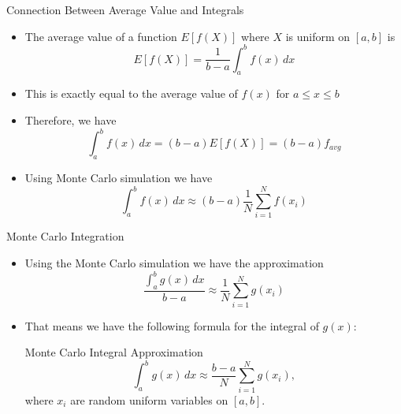 \documentclass[10pt]{beamer}
\begin{document}
\begin{frame}{Connection Between Average Value and Integrals}

\begin{itemize}
    \item The average value of a function $E[f(X)]$ where $X$ is uniform on $[a,b]$ is 
        $$ E[f(X)]= \frac{1}{b-a}\int_a^b f(x)\,dx$$
    \item This is exactly equal to the average value of $f(x)$ for $a \le x \le b$ 
    \item Therefore, we have 
        $$ \int_a^b f(x)\,dx = (b-a)E[f(X)] = (b-a) f_{avg}$$
    \item Using Monte Carlo simulation we have 
        $$\int_a^b f(x)\,dx \approx (b-a) \frac{1}{N} \sum_{i=1}^N f(x_i) $$
\end{itemize}


    
\end{frame}

\begin{frame}{Monte Carlo Integration}

    \begin{itemize}
        \item Using the Monte Carlo simulation we have the approximation 
            $$ \frac{\int_a^b g(x)\,dx}{b-a} \approx \frac{1}{N} \sum_{i=1}^N g(x_i)$$

        \item That means we have the following formula for the integral of $g(x)$:

            \begin{block}{Monte Carlo Integral Approximation}
                $$\int_a^b g(x)\,dx \approx \frac{b-a}{N} \sum_{i=1}^N g(x_i),$$
                where $x_i$ are random uniform variables on $[a,b]$.
            \end{block}
    \end{itemize}
    
\end{frame}
\end{document}
